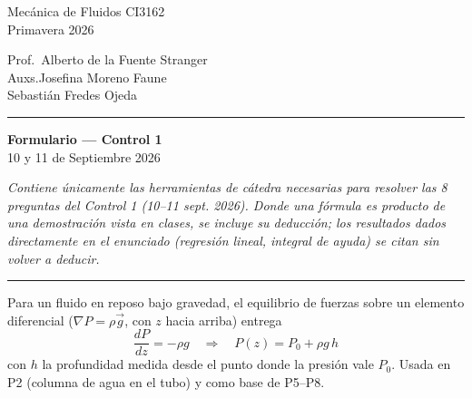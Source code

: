 \documentclass[12pt]{article}
\begin{document}
\shorthandoff{<>}
\large

\noindent
\begin{minipage}[t]{0.45\textwidth}
\raggedright
Mec\'anica de Fluidos CI3162\\
Primavera 2026
\end{minipage}%
\hfill
\begin{minipage}[t]{0.45\textwidth}
\raggedleft
Prof.\ Alberto de la Fuente Stranger\\
Auxs.\hspace{0.6cm}Josefina Moreno Faune\\
Sebasti\'an Fredes Ojeda
\end{minipage}

\vspace{3pt}
\hrule
\vspace{-5pt}

\begin{center}
{\Huge\bfseries Formulario --- Control 1}\\[6pt]
10 y 11 de Septiembre 2026
\end{center}

\vspace{14pt}

\noindent\textit{Contiene \'unicamente las herramientas de c\'atedra necesarias para
resolver las 8 preguntas del Control 1 (10--11 sept. 2026). Donde una f\'ormula es
producto de una demostraci\'on vista en clases, se incluye su deducci\'on; los
resultados dados directamente en el enunciado (regresi\'on lineal, integral de ayuda)
se citan sin volver a deducir.}

\vspace{6pt}
\hrule
\vspace{10pt}


Para un fluido en reposo bajo gravedad, el equilibrio de fuerzas sobre un elemento
diferencial ($\nabla P=\rho\vec g$, con $z$ hacia arriba) entrega
\[
\frac{dP}{dz}=-\rho g \quad\Longrightarrow\quad \boxed{P(z)=P_0+\rho g\,h}
\]
con $h$ la profundidad medida desde el punto donde la presi\'on vale $P_0$. Usada en
P2 (columna de agua en el tubo) y como base de P5--P8.

\end{document}
